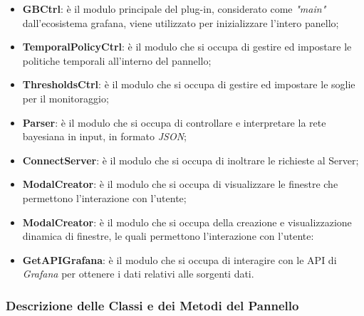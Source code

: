 \begin{itemize}
	\item \textbf{GBCtrl}: è il modulo principale del plug-in, considerato come \textit{"main"} dall'ecosistema grafana, viene utilizzato per inizializzare l'intero panello; 
	\item \textbf{TemporalPolicyCtrl}: è il modulo che si occupa di gestire ed impostare le politiche temporali all'interno del pannello;
	\item \textbf{ThresholdsCtrl}: è il modulo che si occupa di gestire ed impostare le soglie per il monitoraggio;
	\item \textbf{Parser}: è il modulo che si occupa di controllare e interpretare la rete bayesiana in input, in formato \textit{JSON};
	\item \textbf{ConnectServer}: è il modulo che si occupa di inoltrare le richieste al Server;
	\item \textbf{ModalCreator}: è il modulo che si occupa di visualizzare le finestre che permettono l'interazione con l'utente;
	\item \textbf{ModalCreator}: è il modulo che si occupa della creazione e visualizzazione dinamica di finestre, le quali permettono l'interazione con l'utente: 
	\item \textbf{GetAPIGrafana}: è il modulo che si occupa di interagire con le API di \textit{Grafana} per ottenere i dati relativi alle sorgenti dati.
\end{itemize}

\subsubsection{Descrizione delle Classi e dei Metodi del Pannello}\label{classiPannelloDescrizione}
	
